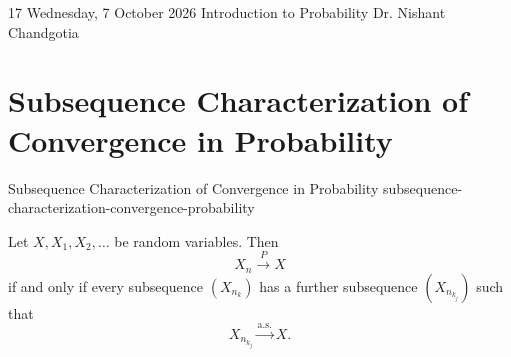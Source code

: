 
\lecture
{17}
{Wednesday, 7 October 2026}
{Introduction to Probability}
{Dr. Nishant Chandgotia}


\section{Subsequence Characterization of Convergence in Probability}

\begin{theorem}
{Subsequence Characterization of Convergence in Probability}
{subsequence-characterization-convergence-probability}

Let $X,X_1,X_2,\ldots$ be random variables. Then
\[
    X_n \xrightarrow{P} X
\]
if and only if every subsequence $(X_{n_k})$ has a further
subsequence $(X_{n_{k_j}})$ such that
\[
    X_{n_{k_j}} \xrightarrow{\mathrm{a.s.}} X.
\]

\end{theorem}


